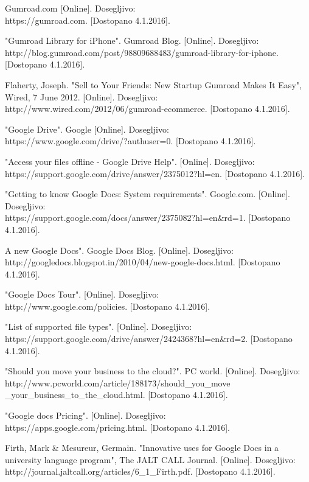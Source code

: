 \documentclass[a4paper, 12pt]{book}
\begin{document}
\begin{thebibliography}{99}
 Gumroad.com 
[Online]. Dosegljivo:\\ https://gumroad.com.
[Dostopano 4.1.2016].


 "Gumroad Library for iPhone". Gumroad Blog.
[Online]. Dosegljivo:\\ http://blog.gumroad.com/post/98809688483/gumroad-library-for-iphone.
[Dostopano 4.1.2016].

 Flaherty, Joseph. "Sell to Your Friends: New Startup Gumroad Makes It Easy", Wired, 7 June 2012. 
[Online]. Dosegljivo:\\ http://www.wired.com/2012/06/gumroad-ecommerce.
[Dostopano 4.1.2016].

 "Google Drive". Google
[Online]. Dosegljivo:\\ https://www.google.com/drive/?authuser=0.
[Dostopano 4.1.2016].

 "Access your files offline - Google Drive Help". 
[Online]. Dosegljivo:\\ https://support.google.com/drive/answer/2375012?hl=en.
[Dostopano 4.1.2016].

 "Getting to know Google Docs: System requirements". Google.com. 
[Online]. Dosegljivo:\\ https://support.google.com/docs/answer/2375082?hl=en\&rd=1.
[Dostopano 4.1.2016].

 A new Google Docs". Google Docs Blog. 
[Online]. Dosegljivo:\\ http://googledocs.blogspot.in/2010/04/new-google-docs.html.
[Dostopano 4.1.2016].

 "Google Docs Tour". 
[Online]. Dosegljivo:\\ http://www.google.com/policies.
[Dostopano 4.1.2016].

 "List of supported file types". 
[Online]. Dosegljivo:\\ https://support.google.com/drive/answer/2424368?hl=en\&rd=2.
[Dostopano 4.1.2016].

 "Should you move your business to the cloud?". PC world. 
[Online]. Dosegljivo:\\ http://www.pcworld.com/article/188173/should\_you\_move
\_your\_business\_to\_the\_cloud.html.
[Dostopano 4.1.2016].

 "Google docs Pricing". 
[Online]. Dosegljivo:\\ https://apps.google.com/pricing.html.
[Dostopano 4.1.2016].

 Firth, Mark \& Mesureur, Germain. "Innovative uses for Google Docs in a university language program", The JALT CALL Journal.
[Online]. Dosegljivo:\\ http://journal.jaltcall.org/articles/6\_1\_Firth.pdf.
[Dostopano 4.1.2016].


\end{thebibliography}
\end{document}
